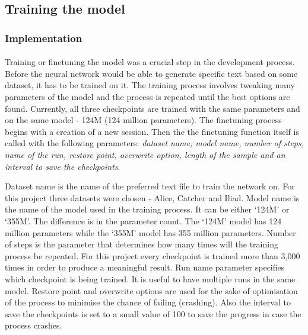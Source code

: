 \documentclass[12pt]{report}
\begin{document}


\subsection*{Training the model}
\subsubsection*{Implementation}
\paragraph{}
Training or finetuning the model was a crucial step in the development process. Before the neural network would
be able to generate specific text based on some dataset, it has to be trained on it. The training process involves
tweaking many parameters of the model and the process is repeated until the best options are found. Currently,
all three checkpoints are trained with the same parameters and on the same model - 124M (124 million parameters). 
The finetuning process begins with a creation of a new session. Then the the finetuning function itself is called
with the following parameters: \textit{dataset name, model name, number of steps, name of the run, restore point,
overwrite option, length of the sample and an interval to save the checkpoints}.

Dataset name is the name of the preferred text file to train the network on. For this project three datasets were
chosen - Alice, Catcher and Iliad. Model name is the name of the model used in the training process. It can be either
`124M' or `355M'. The difference is in the parameter count. The `124M' model has 124 million parameters while the
`355M' model has 355 million parameters. Number of steps is the parameter that determines how many times will the
training process be repeated. For this project every checkpoint is trained more than 3,000 times in order to
produce a meaningful result. Run name parameter specifies which checkpoint is being trained. It is useful to have
multiple runs in the same model. Restore point and overwrite options are used for the sake of optimisation of the
process to minimise the chance of failing (crashing). Also the interval to save the checkpoints is set to a small
value of 100 to save the progress in case the process crashes.
\end{document}

